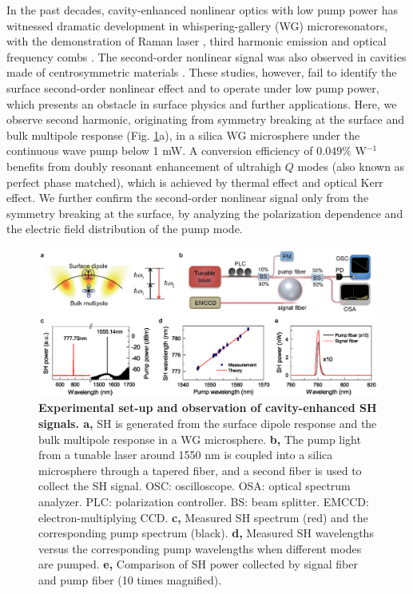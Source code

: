 \documentclass[a4paper,8pt,hyperref, twocolumn]{article}
\begin{document}
In the past decades, cavity-enhanced nonlinear optics with low pump power has witnessed dramatic development in whispering-gallery (WG) microresonators, with the demonstration of Raman laser \cite{spillane2002ultralow}, third harmonic emission \cite{carmon2007visible} and optical frequency combs \cite{del2007optical}. 
The second-order nonlinear signal was also observed
in cavities made of centrosymmetric materials \cite{gouveia2013second, lettieri2002second, lettieri2005second, levy2011harmonic, asano2016visible}.
These studies, however, fail to identify the surface second-order nonlinear effect and to operate under low pump power, which presents an obstacle in surface physics and further applications.
Here, we observe second harmonic, originating from symmetry breaking at the surface and bulk multipole response (Fig. \ref{pic:Fig1}a), in a silica WG microsphere under the continuous wave pump below 1 mW. 
A conversion efficiency of $0.049\%$ W$^{-1}$ benefits from doubly resonant enhancement of ultrahigh $Q$ modes (also known as perfect phase matched), which is achieved by thermal effect and optical Kerr effect. 
We further confirm the second-order nonlinear signal only from the symmetry breaking at the surface, by analyzing the polarization dependence and the electric field distribution of the pump mode. 

\begin{figure}[!ht]
\centering
\includegraphics[width=18cm]{Fig1.eps}
\caption{\textbf{Experimental set-up and observation of cavity-enhanced SH signals. a, }SH is generated from the surface dipole response and the bulk multipole response in a WG microsphere. \textbf{b, }The pump light from a tunable laser around 1550 nm is coupled into a silica microsphere through a tapered fiber, and a second fiber is used to collect the SH signal. OSC: oscilloscope. OSA: optical spectrum analyzer. PLC: polarization controller. BS: beam splitter. EMCCD: electron-multiplying CCD. \textbf{c, }Measured SH spectrum (red) and the corresponding pump spectrum (black). \textbf{d, }Measured SH wavelengths versus the corresponding pump wavelengths when different modes are pumped. \textbf{e, }Comparison of SH power collected by signal fiber and pump fiber (10 times magnified).}
\label{pic:Fig1}
\end{figure}
\end{document}
